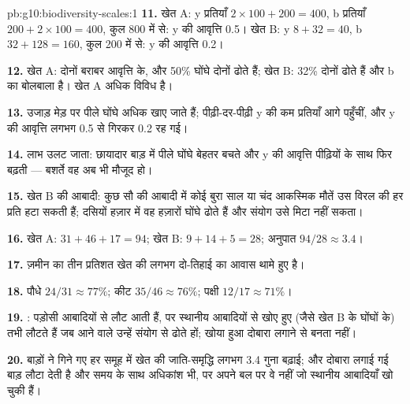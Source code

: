 \begin{solution}{pb:g10:biodiversity-scales:1}
\textbf{11.} खेत A: y प्रतियाँ $2 \times 100 + 200 = 400$, b प्रतियाँ
$200 + 2 \times 100 = 400$, कुल 800 में से: y की आवृत्ति 0.5। खेत B: y
$8 + 32 = 40$, b $32 + 128 = 160$, कुल 200 में से: y की आवृत्ति 0.2।

\textbf{12.} खेत A: दोनों  बराबर आवृत्ति के, और 50\% घोंघे दोनों
ढोते हैं; खेत B: 32\% दोनों ढोते हैं और b का बोलबाला है। खेत A अधिक
विविध है।

\textbf{13.} उजाड़ मेड़ पर पीले घोंघे अधिक खाए जाते हैं; पीढ़ी-दर-पीढ़ी
y की कम प्रतियाँ आगे पहुँचीं, और y की आवृत्ति लगभग 0.5 से गिरकर 0.2 रह
गई।

\textbf{14.} लाभ उलट जाता: छायादार बाड़ में पीले घोंघे बेहतर बचते और y
की आवृत्ति पीढ़ियों के साथ फिर बढ़ती --- बशर्ते वह  अब भी मौजूद
हो।

\textbf{15.} खेत B की आबादी: कुछ सौ की आबादी में कोई बुरा साल या चंद
आकस्मिक मौतें उस विरल  की हर प्रति हटा सकती हैं; दसियों हज़ार में
वह  हज़ारों घोंघे ढोते हैं और संयोग उसे मिटा नहीं सकता।

\textbf{16.} खेत A: $31 + 46 + 17 = 94$; खेत B: $9 + 14 + 5 = 28$;
अनुपात $94/28 \approx 3.4$।

\textbf{17.} ज़मीन का तीन प्रतिशत खेत की लगभग दो-तिहाई  का
आवास थामे हुए है।

\textbf{18.} पौधे $24/31 \approx 77\%$; कीट $35/46 \approx 76\%$;
पक्षी $12/17 \approx 71\%$।

\textbf{19.} :  पड़ोसी आबादियों से लौट आती
हैं, पर स्थानीय आबादियों से खोए हुए  (जैसे खेत B के घोंघों के)
तभी लौटते हैं जब आने वाले उन्हें संयोग से ढोते हों; खोया हुआ 
दोबारा लगाने से बनता नहीं।

\textbf{20.} बाड़ों ने गिने गए हर समूह में खेत की जाति-समृद्धि लगभग
3.4 गुना बढ़ाई; और दोबारा लगाई गई बाड़  लौटा देती है और समय के
साथ अधिकांश  भी, पर अपने बल पर वे  नहीं जो स्थानीय
आबादियाँ खो चुकी हैं।
\end{solution}
